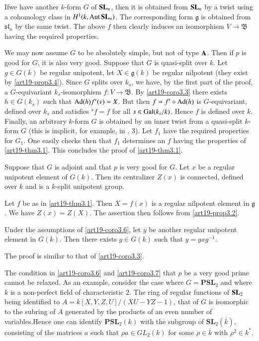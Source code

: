 If\pageoriginale we have another $k$-form $G$ of $\mathbf{S}\mathbf{L}_{n}$, then it is obtained from $\mathbf{S}\mathbf{L}_{n}$ by a twist using a cohomology class in $H^{1}(k,\operatorname{\mathrm{Aut}} \mathbf{S}\mathbf{L}_{n})$. The corresponding form $\mathfrak{g}$ is obtained from $\mathfrak{s}\mathfrak{l}_{n}$ by the same twist. The above $f$ then clearly induces an isomorphism $V\to \mathfrak{B}$ having the required properties.

We may now assume $G$ to be absolutely simple, but not of type $\mathbf{A}$. Then if $p$ is good for $G$, it is also very good. Suppose that $G$ is quasi-split over $k$. Let $g\in G(k)$ be regular unipotent, let $X\in \mathfrak{g}(k)$ be regular nilpotent (they exist by \ref{art19-prop3.4}). Since $G$ splits over $k_{s}$, we have, by the first part of the proof, a $G$-equivariant $k_{s}$-isomorphism $f:V\to \mathfrak{B}$. By \ref{art19-coro3.3} there exists $h\in G(k_{s})$ such that $\operatorname{\mathrm{Ad}}(h)f'(v)=X$. But then $f=f'\circ \operatorname{\mathrm{Ad}}(h)$ is $G$-equivariant, defined over $k_{s}$ and satisfies ${}^{s}f=f$ for all $s\in \operatorname{\mathrm{Gal}}(k_{s}/k)$. Hence $f$ is defined over $k$. Finally, an arbitrary $k$-form $G$ is obtained by an inner twist from a quasi-split $k$-form $G$ (this is implicit, for example, in \cite{art19-key18}, 3). Let $f_{1}$ have the required properties for $G_{1}$. One easily checks then that $f_{1}$ determines an $f$ having the properties of \ref{art19-thm3.1}. This concludes the proof of \ref{art19-thm3.1}.

\begin{corollary}\label{art19-coro3.6}
Suppose that $G$ is adjoint and that $p$ is very good for $G$. Let $x$ be a regular unipotent element of $G(k)$. Then its centralizer $Z(x)$ is connected, defined over $k$ and is a $k$-split unipotent group.
\end{corollary}

Let $f$ be as in \ref{art19-thm3.1}. Then $X=f(x)$ is a regular nilpotent element in $\mathfrak{g}$. We have $Z(x)=Z(X)$. The assertion then follows from \ref{art19-prop3.2}.

\begin{corollary}\label{art19-coro3.7}
Under the assumptions of \ref{art19-coro3.6}, let $y$ be another regular unipotent element in $G(k)$. Then there exists $g\in G(k)$ such that $y=gxg^{-1}$.
\end{corollary}

The proof is similar to that of \ref{art19-coro3.3}.

\begin{remark}\label{art19-rem3.8}
The condition in \ref{art19-coro3.6} and \ref{art19-coro3.7} that $p$ be a very good prime cannot be relaxed. As an example, consider the case where $G=\mathbf{PSL}_{2}$ and where $k$ is a non-perfect field of characteristic $2$. The ring of regular functions of $\mathbf{S}\mathbf{L}_{2}$ being identified to $A=k[X,Y,Z,U]/(XU-YZ-1)$, that of $G$ is isomorphic to the subring of $A$ generated by the products of an even number of variables.\pageoriginale Hence one can identify $\mathbf{PSL}_{2}(k)$ with the subgroup of $\mathbf{SL}_{2}(\overline{k})$, consisting of the matrices $a$ such that $\rho a\in GL_{2}(k)$ for some $\rho\in \overline{k}$ with $\rho^{2}\in k^{*}$.
\end{remark}

